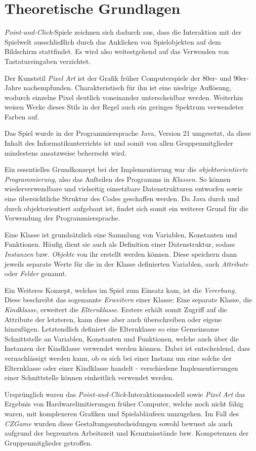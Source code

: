 \chapter{Theoretische Grundlagen}

\textit{Point-and-Click}-Spiele zeichnen sich dadurch aus, dass die Interaktion
mit der Spielwelt ausschließlich durch das Anklicken von Spielobjekten auf dem
Bildschirm stattfindet. Es wird also weitestgehend auf das Verwenden von
Tastatureingaben verzichtet.

Der Kunststil \textit{Pixel Art} ist der Grafik früher Computerspiele der
80er- und 90er-Jahre nachempfunden. Charakteristisch für ihn ist eine niedrige
Auflösung, wodurch einzelne Pixel deutlich voneinander unterscheidbar werden.
Weiterhin weisen Werke dieses Stils in der Regel auch ein geringes Spektrum
verwendeter Farben auf.

Das Spiel wurde in der Programmiersprache Java, Version 21 umgesetzt,
da diese Inhalt des Informatikunterrichts ist und somit von allen Gruppenmitglieder mindestens
ansatzweise beherrscht wird.

Ein essentielles Grundkonzept bei der Implementierung war die \textit{objektorientierte Programmierung},
also das Aufteilen des Programms in \textit{Klassen}. So können wiederverwendbare und vielseitig
einsetzbare Datenstrukturen entworfen sowie eine übersichtliche Struktur des Codes geschaffen werden.
Da Java durch und durch objektorientiert aufgebaut ist, findet sich somit ein weiterer Grund
für die Verwendung der Programmiersprache.

Eine Klasse ist grundsätzlich eine Sammlung von Variablen, Konstanten und Funktionen.
Häufig dient sie auch als Definition einer Datenstruktur, sodass \textit{Instanzen}
bzw. \textit{Objekte} von ihr erstellt werden können. Diese speichern dann
jeweils separate Werte für die in der Klasse definierten Variablen, auch \textit{Attribute}
oder \textit{Felder} genannt.

Ein Weiteres Konzept, welches im Spiel zum Einsatz kam, ist die \textit{Vererbung}.
Diese beschreibt das sogenannte \textit{Erweitern} einer Klasse: Eine separate
Klasse, die \textit{Kindklasse}, erweitert die \textit{Elternklasse}. Erstere
erhält somit Zugriff auf die Attribute der letzteren, kann diese aber auch
überschreiben oder eigene hinzufügen. Letztendlich definiert die Elternklasse
so eine Gemeinsame Schnittstelle an Variablen, Konstanten und Funktionen,
welche auch über die Instanzen der Kindklasse verwendet werden können. Dabei
ist entscheidend, dass vernachlässigt werden kann, ob es sich bei einer Instanz
um eine solche der Elternklasse oder einer Kindklasse handelt - verschiedene
Implementierungen einer Schnittstelle können einheitlich verwendet werden.

Ursprünglich waren das \textit{Point-and-Click}-Interaktionsmodell sowie
\textit{Pixel Art} das Ergebnis von Hardwarelimitierungen früher Computer,
welche noch nicht fähig waren, mit komplexeren Grafiken und Spielabläufeen
umzugehen. Im Fall des \textit{CZGame} wurden diese Gestaltungsentscheidungen
sowohl bewusst als auch aufgrund der begrenzten Arbeitszeit und Kenntnisstände
bzw. Kompetenzen der Gruppenmitglieder getroffen.
